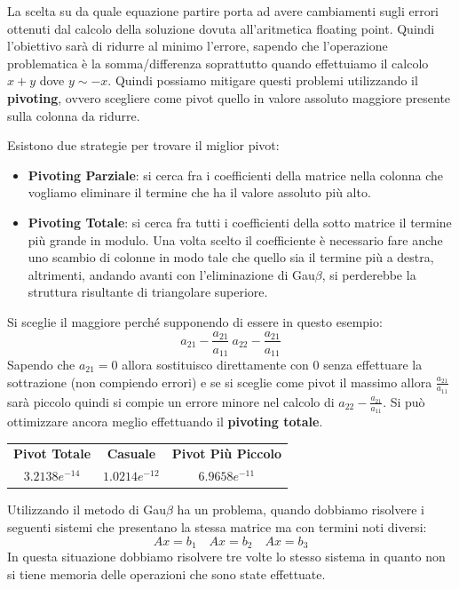 La scelta su da quale equazione partire porta ad avere cambiamenti sugli errori
ottenuti dal calcolo della soluzione dovuta all'aritmetica floating point. Quindi
l'obiettivo sarà di ridurre al minimo l'errore, sapendo che l'operazione problematica
è la somma/differenza soprattutto quando effettuiamo il calcolo $x + y$ dove $y
    \sim -x$. Quindi possiamo mitigare questi problemi utilizzando il \textbf{pivoting},
ovvero scegliere come pivot quello in valore assoluto maggiore presente sulla
colonna da ridurre.

Esistono due strategie per trovare il miglior pivot:
\begin{itemize}
    \item \textbf{Pivoting Parziale}: si cerca fra i coefficienti della matrice
          nella colonna che vogliamo eliminare il termine che ha il valore
          assoluto più alto.
    \item \textbf{Pivoting Totale}:  si cerca fra tutti i coefficienti della
          sotto matrice il termine più grande in modulo. Una volta scelto il
          coefficiente è necessario fare anche uno scambio di colonne in modo
          tale che quello sia il termine più a destra, altrimenti, andando
          avanti con l'eliminazione di Gau$\beta$, si perderebbe la struttura
          risultante di triangolare superiore.
\end{itemize}

Si sceglie il maggiore perché supponendo di essere in questo esempio:
$$a_{21} - \frac{a_{21}}{a_11} \ a_{22}-\frac{a_{21}}{a_11}$$
Sapendo che $a_{21}=0$ allora sostituisco direttamente con $0$ senza effettuare
la sottrazione (non compiendo errori) e se si sceglie come pivot il massimo allora
$\frac{a_{21}}{a_11}$ sarà piccolo quindi si compie un errore minore nel calcolo
di $a_{22}-\frac{a_{21}}{a_11}$. Si può ottimizzare ancora meglio effettuando il
\textbf{pivoting totale}.

\begin{table}
    \centering
    \begin{tabular}{|c|c|c|}
        \hline
        \textbf{Pivot Totale} & \textbf{Casuale} & \textbf{Pivot Più Piccolo} \\
        $3.2138 e^{-14}$      & $1.0214 e^{-12}$ & $6.9658 e^{-11}$           \\
        \hline
    \end{tabular}
\end{table}

Utilizzando il metodo di Gau$\beta$ ha un problema, quando dobbiamo risolvere i
seguenti sistemi che presentano la stessa matrice ma con termini noti diversi:
\begin{equation*}
    Ax=b_1 \quad Ax=b_2 \quad Ax=b_3
\end{equation*}
In questa situazione dobbiamo risolvere tre volte lo stesso sistema in quanto
non si tiene memoria delle operazioni che sono state effettuate.

